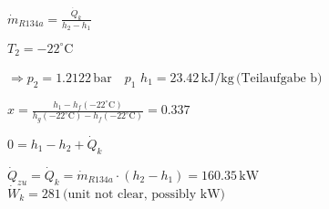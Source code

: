 \( \dot{m}_{R134a} = \frac{\dot{Q}_k}{h_2 - h_1} \)  

\( T_2 = -22^\circ \text{C} \)  

\( \Rightarrow p_2 = 1.2122 \, \text{bar} \quad p_1 \)  
\( h_1 = 23.42 \, \text{kJ/kg} \, \text{(Teilaufgabe b)} \)  

\( x = \frac{h_1 - h_f(-22^\circ \text{C})}{h_g(-22^\circ \text{C}) - h_f(-22^\circ \text{C})} = 0.337 \)  

\( 0 = h_1 - h_2 + \dot{Q}_k \)  

\( \dot{Q}_{zu} = \dot{Q}_k = \dot{m}_{R134a} \cdot (h_2 - h_1) = 160.35 \, \text{kW} \)  
\( \dot{W}_k = 281 \, \text{(unit not clear, possibly kW)} \)